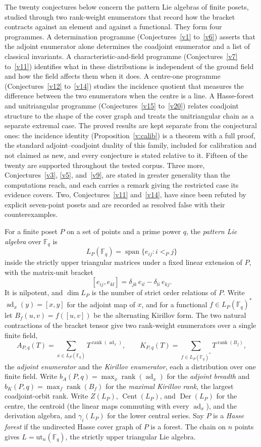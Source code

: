 \documentclass[11pt]{article}
\theoremstyle{definition}
\newcommand{\rank}{\operatorname{rank}}
\newcommand{\Fq}{\mathbb F}
\begin{document}
The twenty conjectures below concern the pattern Lie algebras of finite posets, studied through two rank-weight enumerators that record how the bracket contracts against an element and against a functional.  They form four programmes.  A determination programme (Conjectures~\ref{v1} to~\ref{v6}) asserts that the adjoint enumerator alone determines the coadjoint enumerator and a list of classical invariants.  A characteristic-and-field programme (Conjectures~\ref{v7} to~\ref{v11}) identifies what in these distributions is independent of the ground field and how the field affects them when it does.  A centre-one programme (Conjectures~\ref{v12} to~\ref{v14}) studies the incidence quotient that measures the difference between the two enumerators when the centre is a line.  A Hasse-forest and unitriangular programme (Conjectures~\ref{v15} to~\ref{v20}) relates coadjoint structure to the shape of the cover graph and treats the unitriangular chain as a separate extremal case.  The proved results are kept separate from the conjectural ones: the incidence identity (Proposition~\ref{v:calib}) is a theorem with a full proof, the standard adjoint--coadjoint duality of this family, included for calibration and not claimed as new, and every conjecture is stated relative to it.  Fifteen of the twenty are supported throughout the tested corpus.  Three more, Conjectures~\ref{v3}, \ref{v5}, and~\ref{v9}, are stated in greater generality than the computations reach, and each carries a remark giving the restricted case its evidence covers.  Two, Conjectures~\ref{v11} and~\ref{v14}, have since been refuted by explicit seven-point posets and are recorded as resolved false with their counterexamples.

For a finite poset $P$ on a set of points and a prime power $q$, the \emph{pattern Lie algebra} over $\Fq_q$ is
\[
L_P(\Fq_q)=\operatorname{span}\{e_{ij}:i<_Pj\}
\]
inside the strictly upper triangular matrices under a fixed linear extension of $P$, with the matrix-unit bracket
\[
[e_{ij},e_{kl}]=\delta_{jk}\,e_{il}-\delta_{li}\,e_{kj}.
\]
It is nilpotent, and $\dim L_P$ is the number of strict order relations of $P$.  Write $\operatorname{ad}_x(y)=[x,y]$ for the adjoint map of $x$, and for a functional $f\in L_P(\Fq_q)^*$ let $B_f(u,v)=f([u,v])$ be the alternating Kirillov form.  The two natural contractions of the bracket tensor give two rank-weight enumerators over a single finite field,
\[
A_{P,q}(T)=\sum_{x\in L_P(\Fq_q)}T^{\rank(\operatorname{ad}_x)},
\qquad
K_{P,q}(T)=\sum_{f\in L_P(\Fq_q)^*}T^{\rank(B_f)},
\]
the \emph{adjoint enumerator} and the \emph{Kirillov enumerator}, each a distribution over one finite field.  Write $b_A(P,q)=\max_x\rank(\operatorname{ad}_x)$ for the \emph{adjoint breadth} and $b_K(P,q)=\max_f\rank(B_f)$ for the \emph{maximal Kirillov rank}, the largest coadjoint-orbit rank.  Write $Z(L_P)$, $\operatorname{Cent}(L_P)$, and $\operatorname{Der}(L_P)$ for the centre, the centroid (the linear maps commuting with every $\operatorname{ad}_x$), and the derivation algebra, and $\gamma_i(L_P)$ for the lower central series.  Say $P$ is a \emph{Hasse forest} if the undirected Hasse cover graph of $P$ is a forest.  The chain on $n$ points gives $L=\mathrm{ut}_n(\Fq_q)$, the strictly upper triangular Lie algebra.
\end{document}
